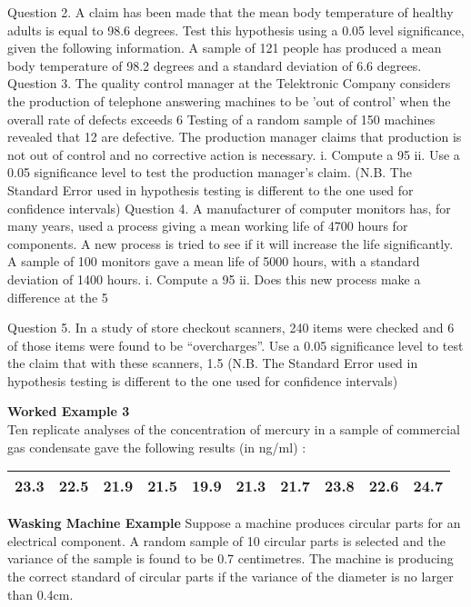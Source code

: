 Question 2.
A claim has been made that the mean body temperature of healthy adults is equal to 98.6 degrees. Test this hypothesis using a 0.05 level significance, given the following information.
A sample of 121 people has produced a mean body temperature of 98.2 degrees and a standard deviation of 6.6 degrees.  
Question 3.
The quality control manager at the Telektronic Company considers the production of telephone answering machines to be ’out of control’ when the overall rate of defects exceeds 6%
Testing of a random sample of 150 machines revealed that 12 are defective. The production manager claims that production is not out of control and no corrective action is necessary.
i.	Compute a 95%
ii.	Use a 0.05 significance level to test the production manager’s claim.
(N.B. The Standard Error used in hypothesis testing is different to the one used for confidence intervals)
Question 4.
A manufacturer of computer monitors  has, for many years, used a process giving a mean  working life of 4700 hours  for components.
A new process is tried to see if it will increase the life significantly. A sample of 100 monitors gave a mean life of 5000 hours, with a standard deviation of 1400 hours.
i.	Compute a 95%
ii.	Does this new process make a difference at the 5%




Question 5.
In a study of store checkout scanners, 240 items were checked and 6 of those items were found to be “overcharges”.
Use a 0.05 significance level to test the claim that with these scanners, 1.5 %
(N.B. The Standard Error used in hypothesis testing is different to the one used for confidence intervals)

	\item \textbf{Worked Example 3} \\ Ten replicate analyses of the concentration
	of mercury in a sample of commercial gas condensate gave the
	following results (in ng/ml) :
	
	\begin{tabular}{|c|c|c|c|c|c|c|c|c|c|}
		\hline
		23.3 & 22.5 & 21.9 & 21.5 & 19.9 & 21.3 & 21.7 & 23.8 & 22.6 &
		24.7\\
		\hline
	\end{tabular}
	
	\item \textbf{Wasking Machine Example}%
	Suppose a machine produces circular parts for an electrical component. A random sample of 10 circular parts is selected and the variance of the sample is found to be 0.7 centimetres. The machine is producing the correct standard of circular parts if the variance of the diameter is no larger than 0.4cm.
	
